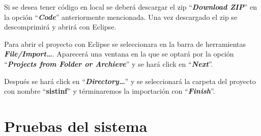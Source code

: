
Si se desea tener código en local se deberá descargar el zip ``\textbf{\textit{Download ZIP}}'' en la opción ``\textbf{\textit{Code}}'' anteriormente mencionada. Una vez descargado el zip se descomprimirá y abrirá con Eclipse. 

Para abrir el proyecto con Eclipse se seleccionara en la barra de herramientas \textbf{\textit{File/Import\dots}}. Aparecerá una ventana en la que se optará por la opción ``\textbf{\textit{Projects from Folder or Archieve}}'' y se hará click en ``\textbf{\textit{Next}}''.

Después se hará click en ``\textbf{\textit{Directory\dots}}'' y se seleccionará la carpeta del proyecto con nombre ``\textbf{sistinf}'' y términaremos la importación con ``\textbf{\textit{Finish}}''.
	
\section{Pruebas del sistema}

